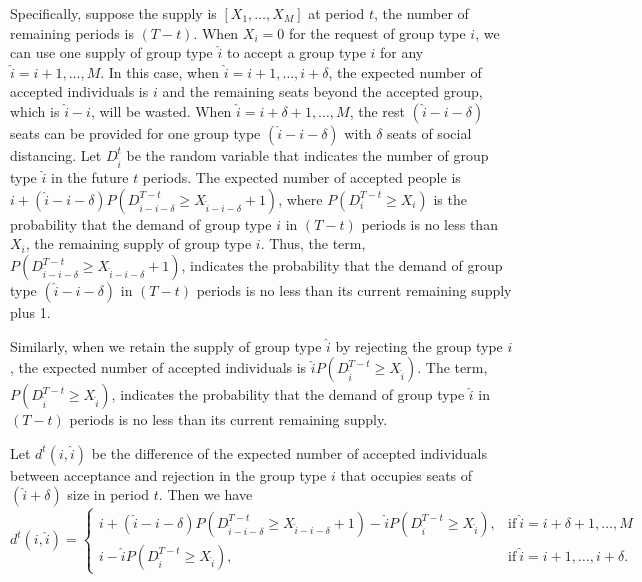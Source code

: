 Specifically, suppose the supply is $[X_1, \ldots, X_M]$ at period $t$, the number of remaining periods is $(T-t)$. When $X_{i} = 0$ for the request of group type $i$, we can use one supply of group type $\hat{i}$ to accept a group type ${i}$ for any $\hat{i}={i}+1, \ldots, M$. In this case, when $\hat{i} = {i}+1, \ldots, i+\delta$, the expected number of accepted individuals is ${i}$ and the remaining seats beyond the accepted group, which is $\hat{i}-{i}$, will be wasted. When $\hat{i} = {i}+\delta+1, \ldots, M$, the rest $(\hat{i}-{i}-\delta)$ seats can be provided for one group type $(\hat{i}-{i}-\delta)$ with $\delta$ seats of social distancing. Let $D_{\hat{i}}^{t}$ be the random variable that indicates the number of group type $\hat{i}$ in the future $t$ periods. The expected number of accepted people is ${i} + (\hat{i}-{i}-\delta)P(D_{\hat{i}-{i}-\delta}^{T-t} \geq X_{\hat{i}-{i}-\delta}+1)$, where $P(D_{i}^{T-t} \geq X_{i})$ is the probability that the demand of group type ${i}$ in $(T-t)$ periods is no less than $X_{i}$, the remaining supply of group type ${i}$. Thus, the term, $P(D_{\hat{i}-{i}-\delta}^{T-t} \geq X_{\hat{i}-{i}-\delta}+1)$, indicates the probability that the demand of group type $(\hat{i}-{i}-\delta)$ in $(T-t)$ periods is no less than its current remaining supply plus 1.

Similarly, when we retain the supply of group type $\hat{i}$ by rejecting the group type ${i}$, the expected number of accepted individuals is $\hat{i} P(D_{\hat{i}}^{T-t} \geq X_{\hat{i}})$. The term, $P(D_{\hat{i}}^{T-t} \geq X_{\hat{i}})$, indicates the probability that the demand of group type $\hat{i}$ in $(T-t)$ periods is no less than its current remaining supply.

Let $d^{t}({i},\hat{i})$ be the difference of the expected number of accepted individuals between acceptance and rejection in the group type ${i}$ that occupies seats of $(\hat{i}+\delta)$ size in period $t$. Then we have
\begin{equation*}
	d^{t}({i},\hat{i}) = \begin{cases}
    {i} + (\hat{i}-{i}-\delta)P(D_{\hat{i}-{i}-\delta}^{T-t} \geq X_{\hat{i}-{i}-\delta}+1) - \hat{i} P(D_{\hat{i}}^{T-t} \geq X_{\hat{i}}), &\text{if}~ \hat{i} = {i}+\delta+1, \ldots, M \\
    {i} - \hat{i} P(D_{\hat{i}}^{T-t} \geq X_{\hat{i}}), &\text{if}~ \hat{i} = {i}+1, \ldots, {i}+\delta.
		\end{cases}
\end{equation*}

